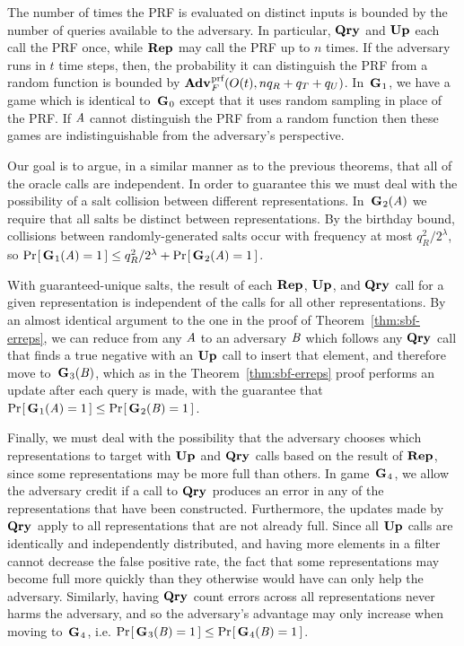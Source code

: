 The number of times the PRF is evaluated on distinct inputs is bounded by the
number of queries available to the adversary. In particular, $\textup{\textbf{Qry}}\hspace{0.5pt}$ and $\textup{\textbf{Up}}\hspace{0.5pt}$
each call the PRF once, while $\textup{\textbf{Rep}}\hspace{0.5pt}$ may call the PRF up to $n$ times. If the
adversary runs in $t$ time steps, then, the probability it can distinguish the
PRF from a random function is bounded by $\Adv{\prf}_F(O(t),nq_R+q_T+q_U)$.
%
In~$\textup{\textbf{G}}\hspace{0.5pt}_1$, we have a game which is identical to~$\textup{\textbf{G}}\hspace{0.5pt}_0$ except that it uses
random sampling in place of the PRF. If $\mathit{A}$ cannot distinguish the PRF from
a random function then these games are indistinguishable from the adversary's
perspective.
%

Our goal is to argue, in a similar manner as to the previous theorems, that all
of the oracle calls are independent. In order to guarantee this we must deal
with the possibility of a salt collision between different representations.
In~$\textup{\textbf{G}}\hspace{0.5pt}_2(\mathit{A})$ we require that all salts be distinct between
representations. By the birthday bound, collisions between randomly-generated
salts occur with frequency at most $q_R^2/2^\lambda$, so $\Pr\hspace{-1pt}\left[\,\textup{\textbf{G}}\hspace{0.5pt}_1(\mathit{A}) =
1\,\right] \le q_R^2/2^\lambda + \Pr\hspace{-1pt}\left[\,\textup{\textbf{G}}\hspace{0.5pt}_2(\mathit{A}) = 1\,\right]$.

With guaranteed-unique salts, the result of each $\textup{\textbf{Rep}}\hspace{0.5pt}$, $\textup{\textbf{Up}}\hspace{0.5pt}$, and $\textup{\textbf{Qry}}\hspace{0.5pt}$
call for a given representation is independent of the calls for all other
representations. By an almost identical argument to the one in the proof of
Theorem~\ref{thm:sbf-erreps}, we can reduce from any $\mathit{A}$ to an adversary
$\mathit{B}$ which follows any $\textup{\textbf{Qry}}\hspace{0.5pt}$ call that finds a true negative with an
$\textup{\textbf{Up}}\hspace{0.5pt}$ call to insert that element, and therefore move to~$\textup{\textbf{G}}\hspace{0.5pt}_3(\mathit{B})$,
which as in the Theorem~\ref{thm:sbf-erreps} proof performs an update after each
query is made, with the guarantee that $\Pr\hspace{-1pt}\left[\,\textup{\textbf{G}}\hspace{0.5pt}_1(\mathit{A}) = 1\,\right] \le
\Pr\hspace{-1pt}\left[\,\textup{\textbf{G}}\hspace{0.5pt}_2(\mathit{B}) = 1\,\right]$.

Finally, we must deal with the possibility that the adversary chooses which
representations to target with $\textup{\textbf{Up}}\hspace{0.5pt}$ and $\textup{\textbf{Qry}}\hspace{0.5pt}$ calls based on the result of
$\textup{\textbf{Rep}}\hspace{0.5pt}$, since some representations may be more full than others. In
game~$\textup{\textbf{G}}\hspace{0.5pt}_4$, we allow the adversary credit if a call to
$\textup{\textbf{Qry}}\hspace{0.5pt}$ produces an error in any of the representations that have been
constructed. Furthermore, the updates made by $\textup{\textbf{Qry}}\hspace{0.5pt}$ apply to all
representations that are not already full. Since all $\textup{\textbf{Up}}\hspace{0.5pt}$ calls are
identically and independently distributed, and having more elements in a filter
cannot decrease the false positive rate, the fact that some representations may
become full more quickly than they otherwise would have can only help the
adversary. Similarly, having $\textup{\textbf{Qry}}\hspace{0.5pt}$ count errors across all representations
never harms the adversary, and so the adversary's advantage may only increase
when moving to~$\textup{\textbf{G}}\hspace{0.5pt}_4$,
i.e. $\Pr\hspace{-1pt}\left[\,\textup{\textbf{G}}\hspace{0.5pt}_3(\mathit{B}) = 1\,\right] \le \Pr\hspace{-1pt}\left[\,\textup{\textbf{G}}\hspace{0.5pt}_4(\mathit{B}) = 1\,\right]$.

